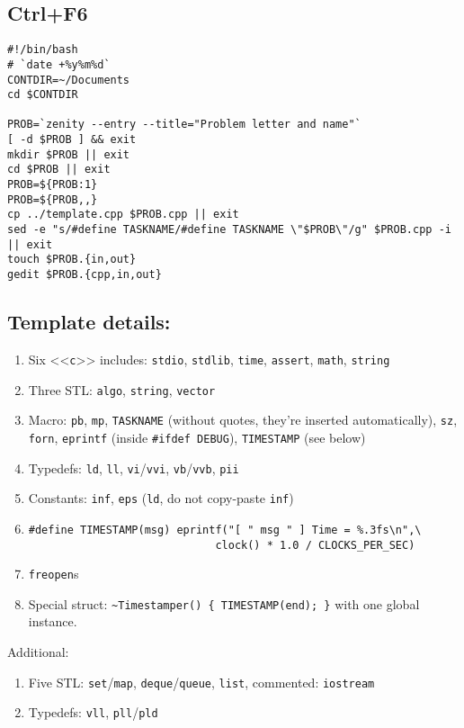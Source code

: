 \subsection{Ctrl+F6}

\begin{verbatim}
#!/bin/bash
# `date +%y%m%d`
CONTDIR=~/Documents
cd $CONTDIR

PROB=`zenity --entry --title="Problem letter and name"`
[ -d $PROB ] && exit
mkdir $PROB || exit
cd $PROB || exit
PROB=${PROB:1}
PROB=${PROB,,}
cp ../template.cpp $PROB.cpp || exit
sed -e "s/#define TASKNAME/#define TASKNAME \"$PROB\"/g" $PROB.cpp -i || exit
touch $PROB.{in,out}
gedit $PROB.{cpp,in,out}			
\end{verbatim}

\subsection{Template details:}
\begin{enumerate}
\item Six <<\texttt{c}>> includes: \texttt{stdio}, \texttt{stdlib}, \texttt{time}, \texttt{assert}, \texttt{math}, \texttt{string}
\item Three STL: \texttt{algo}, \texttt{string}, \texttt{vector}
\item Macro: \texttt{pb}, \texttt{mp}, \texttt{TASKNAME} (without quotes, they're inserted automatically), \texttt{sz}, \texttt{forn}, \texttt{eprintf} (inside \texttt{\#ifdef~DEBUG}), \texttt{TIMESTAMP} (see below)
\item Typedefs: \texttt{ld}, \texttt{ll}, \texttt{vi}/\texttt{vvi}, \texttt{vb}/\texttt{vvb}, \texttt{pii}
\item Constants: \texttt{inf}, \texttt{eps} (\texttt{ld}, do not copy-paste \texttt{inf})
\item
\begin{verbatim}
#define TIMESTAMP(msg) eprintf("[ " msg " ] Time = %.3fs\n",\
                             clock() * 1.0 / CLOCKS_PER_SEC)
\end{verbatim}

\item \texttt{freopen}s
\item Special struct: \texttt{\~{}Timestamper() \{ TIMESTAMP(end); \}} with one global instance.
\end{enumerate}

Additional:
\begin{enumerate}
\item Five STL:  \texttt{set}/\texttt{map}, \texttt{deque}/\texttt{queue}, \texttt{list}, commented: \texttt{iostream}
\item Typedefs: \texttt{vll}, \texttt{pll}/\texttt{pld}
\end{enumerate}

